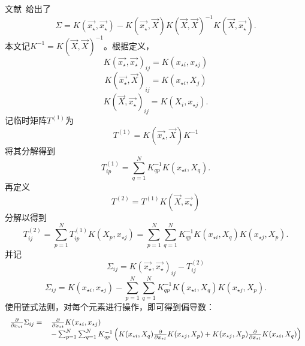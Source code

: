 \documentclass[index]{subfiles}
\begin{document}
文献~\cite{RW}给出了
\begin{equation}
 \Sigma = K(\vec{x_{\star}}, \vec{x_{\star}}) - K(\vec{x_{\star}}, \vec{X}) K(\vec{X}, \vec{X})^{-1} K(\vec{X}, \vec{x_{\star}}).
\end{equation}
本文记$K^{-1} = K(\vec{X}, \vec{X})^{-1}$。根据定义，
\begin{equation}
 K(\vec{x_{\star}}, \vec{x_{\star}})_{ij} = K(x_{\star i}, x_{\star j})
\end{equation}
\begin{equation}
 K(\vec{x_{\star}}, \vec{X})_{ij} = K(x_{\star i}, X_{j})
\end{equation}
\begin{equation}
 K(\vec{X}, \vec{x_{\star}})_{ij} = K(X_{i}, x_{\star j}).
\end{equation}
记临时矩阵$T^{(1)}$为
\begin{equation}
 T^{(1)} = K(\vec{x_{\star}}, \vec{X}) K^{-1}
\end{equation}
将其分解得到
\begin{equation}
 T^{(1)}_{ip} = \sum_{q = 1}^{N} K^{-1}_{qp} K(x_{\star i}, X_{q}).
\end{equation}
再定义
\begin{equation}
 T^{(2)} = T^{(1)} K(\vec{X}, \vec{x_{\star}})
\end{equation}
分解以得到
\begin{equation}
 T^{(2)}_{ij} = \sum_{p = 1}^{N} T^{(1)}_{ip} K(X_{p}, x_{\star j}) = \sum_{p = 1}^{N} \sum_{q = 1}^{N} K^{-1}_{qp} K(x_{\star i}, X_{q}) K(x_{\star j}, X_{p}).
\end{equation}
并记
\begin{equation}
 \Sigma_{ij} = K(\vec{x_{\star}}, \vec{x_{\star}})_{ij} - T^{(2)}_{ij}
\end{equation}
\begin{equation}
 \Sigma_{ij} = K(x_{\star i}, x_{\star j}) - \sum_{p = 1}^{N} \sum_{q = 1}^{N} K^{-1}_{qp} K(x_{\star i}, X_{q}) K(x_{\star j}, X_{p}).
\end{equation}
使用链式法则，对每个元素进行操作，即可得到偏导数：
\begin{equation}
 \begin{tabular}{rl}
 $\frac{\partial}{\partial x_{\star t}} \Sigma_{ij} =$ & $\frac{\partial}{\partial x_{\star t}} K(x_{\star i}, x_{\star j})$ \\
 & $- \sum_{p = 1}^{N} \sum_{q = 1}^{N} K^{-1}_{qp} \left( K(x_{\star i}, X_{q}) \frac{\partial}{\partial x_{\star t}} K(x_{\star j}, X_{p}) + K(x_{\star j}, X_{p}) \frac{\partial}{\partial x_{\star t}} K(x_{\star i}, X_{q}) \right)$
 \end{tabular}
\end{equation}
\end{document}
